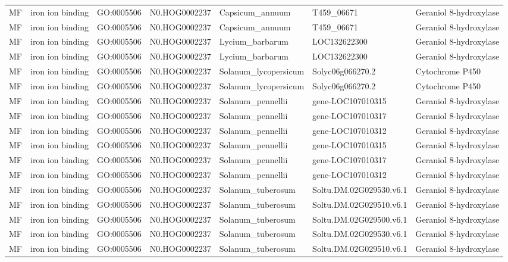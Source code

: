 \begin{table}
\begin{tabular}[t]{lllllll}
MF & iron ion binding & GO:0005506 & N0.HOG0002237 & Capsicum\_annuum & T459\_06671 & Geraniol 8-hydroxylase\\
MF & iron ion binding & GO:0005506 & N0.HOG0002237 & Capsicum\_annuum & T459\_06671 & Geraniol 8-hydroxylase\\
MF & iron ion binding & GO:0005506 & N0.HOG0002237 & Lycium\_barbarum & LOC132622300 & Geraniol 8-hydroxylase\\
MF & iron ion binding & GO:0005506 & N0.HOG0002237 & Lycium\_barbarum & LOC132622300 & Geraniol 8-hydroxylase\\
MF & iron ion binding & GO:0005506 & N0.HOG0002237 & Solanum\_lycopersicum & Solyc06g066270.2 & Cytochrome P450\\
MF & iron ion binding & GO:0005506 & N0.HOG0002237 & Solanum\_lycopersicum & Solyc06g066270.2 & Cytochrome P450\\
MF & iron ion binding & GO:0005506 & N0.HOG0002237 & Solanum\_pennellii & gene-LOC107010315 & Geraniol 8-hydroxylase\\
MF & iron ion binding & GO:0005506 & N0.HOG0002237 & Solanum\_pennellii & gene-LOC107010317 & Geraniol 8-hydroxylase\\
MF & iron ion binding & GO:0005506 & N0.HOG0002237 & Solanum\_pennellii & gene-LOC107010312 & Geraniol 8-hydroxylase\\
MF & iron ion binding & GO:0005506 & N0.HOG0002237 & Solanum\_pennellii & gene-LOC107010315 & Geraniol 8-hydroxylase\\
MF & iron ion binding & GO:0005506 & N0.HOG0002237 & Solanum\_pennellii & gene-LOC107010317 & Geraniol 8-hydroxylase\\
MF & iron ion binding & GO:0005506 & N0.HOG0002237 & Solanum\_pennellii & gene-LOC107010312 & Geraniol 8-hydroxylase\\
MF & iron ion binding & GO:0005506 & N0.HOG0002237 & Solanum\_tuberosum & Soltu.DM.02G029530.v6.1 & Geraniol 8-hydroxylase\\
MF & iron ion binding & GO:0005506 & N0.HOG0002237 & Solanum\_tuberosum & Soltu.DM.02G029510.v6.1 & Geraniol 8-hydroxylase\\
MF & iron ion binding & GO:0005506 & N0.HOG0002237 & Solanum\_tuberosum & Soltu.DM.02G029500.v6.1 & Geraniol 8-hydroxylase\\
MF & iron ion binding & GO:0005506 & N0.HOG0002237 & Solanum\_tuberosum & Soltu.DM.02G029530.v6.1 & Geraniol 8-hydroxylase\\
MF & iron ion binding & GO:0005506 & N0.HOG0002237 & Solanum\_tuberosum & Soltu.DM.02G029510.v6.1 & Geraniol 8-hydroxylase\\

\end{tabular}
\end{table}
